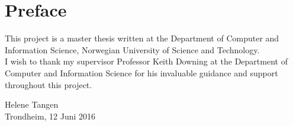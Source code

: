 \section*{Preface}


\noindent This project is a master thesis written at the Department of Computer and Information Science, Norwegian University of Science and Technology.\\

\noindent I wish to thank my supervisor Professor Keith Downing at the Department of Computer and Information Science for his invaluable guidance and support throughout this project.\\

\vfill

\begin{flushright}
Helene Tangen\\
Trondheim, 12 Juni 2016
\end{flushright}

\newpage